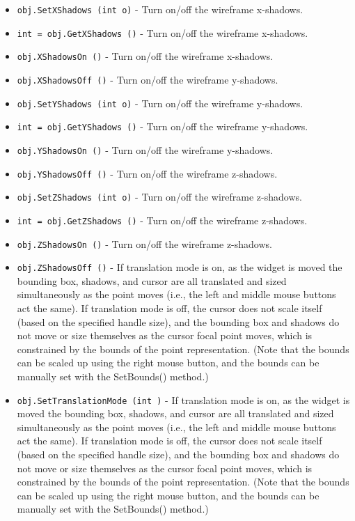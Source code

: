 \begin{itemize}
\item  \verb|obj.SetXShadows (int o)| -  Turn on/off the wireframe x-shadows.

\item  \verb|int = obj.GetXShadows ()| -  Turn on/off the wireframe x-shadows.

\item  \verb|obj.XShadowsOn ()| -  Turn on/off the wireframe x-shadows.

\item  \verb|obj.XShadowsOff ()| -  Turn on/off the wireframe y-shadows.

\item  \verb|obj.SetYShadows (int o)| -  Turn on/off the wireframe y-shadows.

\item  \verb|int = obj.GetYShadows ()| -  Turn on/off the wireframe y-shadows.

\item  \verb|obj.YShadowsOn ()| -  Turn on/off the wireframe y-shadows.

\item  \verb|obj.YShadowsOff ()| -  Turn on/off the wireframe z-shadows.

\item  \verb|obj.SetZShadows (int o)| -  Turn on/off the wireframe z-shadows.

\item  \verb|int = obj.GetZShadows ()| -  Turn on/off the wireframe z-shadows.

\item  \verb|obj.ZShadowsOn ()| -  Turn on/off the wireframe z-shadows.

\item  \verb|obj.ZShadowsOff ()| -  If translation mode is on, as the widget is moved the bounding box,
 shadows, and cursor are all translated and sized simultaneously as the
 point moves (i.e., the left and middle mouse buttons act the same). If
 translation mode is off, the cursor does not scale itself (based on the
 specified handle size), and the bounding box and shadows do not move or
 size themselves as the cursor focal point moves, which is constrained by
 the bounds of the point representation. (Note that the bounds can be
 scaled up using the right mouse button, and the bounds can be manually
 set with the SetBounds() method.)

\item  \verb|obj.SetTranslationMode (int )| -  If translation mode is on, as the widget is moved the bounding box,
 shadows, and cursor are all translated and sized simultaneously as the
 point moves (i.e., the left and middle mouse buttons act the same). If
 translation mode is off, the cursor does not scale itself (based on the
 specified handle size), and the bounding box and shadows do not move or
 size themselves as the cursor focal point moves, which is constrained by
 the bounds of the point representation. (Note that the bounds can be
 scaled up using the right mouse button, and the bounds can be manually
 set with the SetBounds() method.)


\end{itemize}
